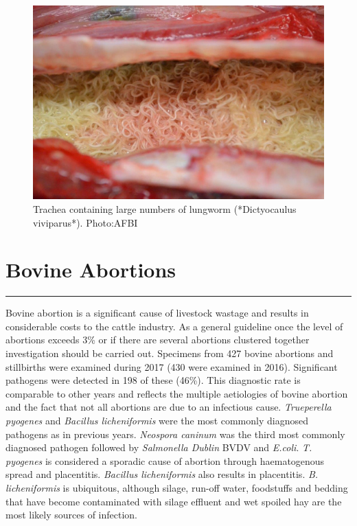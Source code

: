 \documentclass[]{book}
\begin{document}
\begin{figure}

{\centering \includegraphics[width=14.22in]{_images/Lungworm} 

}

\caption{Trachea containing large numbers of lungworm (*Dictyocaulus viviparus*). Photo:AFBI}\label{fig:foo3}
\end{figure}

\chapter{Bovine Abortions}\label{bovine-abortions}

\begin{center}\rule{0.5\linewidth}{\linethickness}\end{center}

Bovine abortion is a significant cause of livestock wastage and results
in considerable costs to the cattle industry. As a general guideline
once the level of abortions exceeds 3\% or if there are several
abortions clustered together investigation should be carried out.
Specimens from 427 bovine abortions and stillbirths were examined during
2017 (430 were examined in 2016). Significant pathogens were detected in
198 of these (46\%). This diagnostic rate is comparable to other years
and reflects the multiple aetiologies of bovine abortion and the fact
that not all abortions are due to an infectious cause. \emph{Trueperella
pyogenes} and \emph{Bacillus licheniformis} were the most commonly
diagnosed pathogens as in previous years. \emph{Neospora caninum} was
the third most commonly diagnosed pathogen followed by \emph{Salmonella
Dublin} BVDV and \emph{E.coli}. \emph{T. pyogenes} is considered a
sporadic cause of abortion through haematogenous spread and placentitis.
\emph{Bacillus licheniformis} also results in placentitis. \emph{B.
licheniformis} is ubiquitous, although silage, run-off water, foodstuffs
and bedding that have become contaminated with silage effluent and wet
spoiled hay are the most likely sources of infection.
\end{document}
